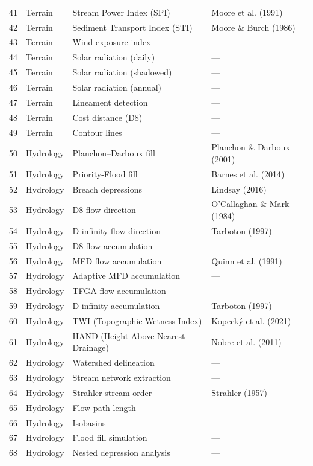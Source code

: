 \documentclass[11pt]{article}
\begin{document}
\begin{longtable}{@{}clp{5.5cm}p{4.5cm}@{}}
41 & Terrain & Stream Power Index (SPI) & Moore et al. (1991) \\
42 & Terrain & Sediment Transport Index (STI) & Moore \& Burch (1986) \\
43 & Terrain & Wind exposure index & --- \\
44 & Terrain & Solar radiation (daily) & --- \\
45 & Terrain & Solar radiation (shadowed) & --- \\
46 & Terrain & Solar radiation (annual) & --- \\
47 & Terrain & Lineament detection & --- \\
48 & Terrain & Cost distance (D8) & --- \\
49 & Terrain & Contour lines & --- \\

50 & Hydrology & Planchon--Darboux fill & Planchon \& Darboux (2001) \\
51 & Hydrology & Priority-Flood fill & Barnes et al. (2014) \\
52 & Hydrology & Breach depressions & Lindsay (2016) \\
53 & Hydrology & D8 flow direction & O'Callaghan \& Mark (1984) \\
54 & Hydrology & D-infinity flow direction & Tarboton (1997) \\
55 & Hydrology & D8 flow accumulation & --- \\
56 & Hydrology & MFD flow accumulation & Quinn et al. (1991) \\
57 & Hydrology & Adaptive MFD accumulation & --- \\
58 & Hydrology & TFGA flow accumulation & --- \\
59 & Hydrology & D-infinity accumulation & Tarboton (1997) \\
60 & Hydrology & TWI (Topographic Wetness Index) & Kopecký et al. (2021) \\
61 & Hydrology & HAND (Height Above Nearest Drainage) & Nobre et al. (2011) \\
62 & Hydrology & Watershed delineation & --- \\
63 & Hydrology & Stream network extraction & --- \\
64 & Hydrology & Strahler stream order & Strahler (1957) \\
65 & Hydrology & Flow path length & --- \\
66 & Hydrology & Isobasins & --- \\
67 & Hydrology & Flood fill simulation & --- \\
68 & Hydrology & Nested depression analysis & --- \\


\end{longtable}
\end{document}
